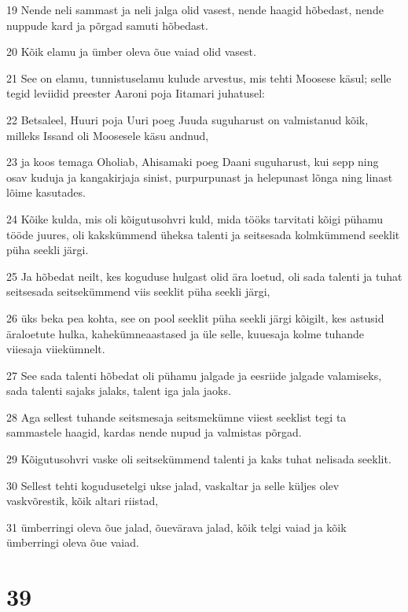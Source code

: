 \par 19 Nende neli sammast ja neli jalga olid vasest, nende haagid hõbedast, nende nuppude kard ja põrgad samuti hõbedast.
\par 20 Kõik elamu ja ümber oleva õue vaiad olid vasest.
\par 21 See on elamu, tunnistuselamu kulude arvestus, mis tehti Moosese käsul; selle tegid leviidid preester Aaroni poja Iitamari juhatusel:
\par 22 Betsaleel, Huuri poja Uuri poeg Juuda suguharust on valmistanud kõik, milleks Issand oli Moosesele käsu andnud,
\par 23 ja koos temaga Oholiab, Ahisamaki poeg Daani suguharust, kui sepp ning osav kuduja ja kangakirjaja sinist, purpurpunast ja helepunast lõnga ning linast lõime kasutades.
\par 24 Kõike kulda, mis oli kõigutusohvri kuld, mida tööks tarvitati kõigi pühamu tööde juures, oli kakskümmend üheksa talenti ja seitsesada kolmkümmend seeklit püha seekli järgi.
\par 25 Ja hõbedat neilt, kes koguduse hulgast olid ära loetud, oli sada talenti ja tuhat seitsesada seitsekümmend viis seeklit püha seekli järgi,
\par 26 üks beka pea kohta, see on pool seeklit püha seekli järgi kõigilt, kes astusid äraloetute hulka, kahekümneaastased ja üle selle, kuuesaja kolme tuhande viiesaja viiekümnelt.
\par 27 See sada talenti hõbedat oli pühamu jalgade ja eesriide jalgade valamiseks, sada talenti sajaks jalaks, talent iga jala jaoks.
\par 28 Aga sellest tuhande seitsmesaja seitsmekümne viiest seeklist tegi ta sammastele haagid, kardas nende nupud ja valmistas põrgad.
\par 29 Kõigutusohvri vaske oli seitsekümmend talenti ja kaks tuhat nelisada seeklit.
\par 30 Sellest tehti kogudusetelgi ukse jalad, vaskaltar ja selle küljes olev vaskvõrestik, kõik altari riistad,
\par 31 ümberringi oleva õue jalad, õuevärava jalad, kõik telgi vaiad ja kõik ümberringi oleva õue vaiad.

\chapter{39}

